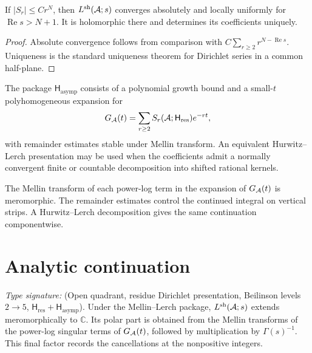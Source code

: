 \begin{proposition}
\label{prop:shL-convergence-half-plane}
\ClaimStatusProvedHere
If \(|S_r|\le Cr^N\), then \(L^{\mathrm{sh}}(\mathcal A;s)\) converges absolutely and
locally uniformly for \(\operatorname{Re}s>N+1\).  It is holomorphic
there and determines its coefficients uniquely.
\end{proposition}

\begin{proof}
Absolute convergence follows from comparison with
\(C\sum_{r\ge2}r^{N-\operatorname{Re}s}\).  Uniqueness is the standard
uniqueness theorem for Dirichlet series in a common half-plane.
\end{proof}

\begin{definition}
\label{def:hurwitz-lerch-shadow}
\ClaimStatusDefinitional
The package \(\mathsf H_{\mathrm{asymp}}\) consists of a polynomial
growth bound and a small-\(t\) polyhomogeneous expansion for
\[
 G_{\mathcal A}(t)=\sum_{r\ge2}S_r(\mathcal A;\mathsf H_{\mathrm{res}})e^{-rt},
\]
with remainder estimates stable under Mellin transform.  An equivalent
Hurwitz--Lerch presentation may be used when the coefficients admit a
normally convergent finite or countable decomposition into shifted
rational kernels.
\end{definition}

\begin{remark}
\label{rem:hurwitz-lerch-analytic-continuation}
The Mellin transform of each power-log term in the expansion of
\(G_{\mathcal A}(t)\) is meromorphic.  The remainder estimates control the
continued integral on vertical strips.  A Hurwitz--Lerch decomposition
gives the same continuation componentwise.
\end{remark}

\section{Analytic continuation}
\label{sec:shL-continuation}

\begin{theorem}
\label{thm:shadow-L-analytic-continuation}
\ClaimStatusConditional
\emph{Type signature:}
\textup{(Open quadrant, residue Dirichlet presentation, Beilinson
levels \(2\to5\),
\(\mathsf H_{\mathrm{res}}+\mathsf H_{\mathrm{asymp}}\)).}
Under the Mellin--Lerch package, \(L^{\mathrm{sh}}(\mathcal A;s)\) extends
meromorphically to \(\mathbb C\).  Its polar part is obtained from the
Mellin transforms of the power-log singular terms of
\(G_{\mathcal A}(t)\), followed by multiplication by \(\Gamma(s)^{-1}\).
This final factor records the cancellations at the nonpositive
integers.
\end{theorem}

